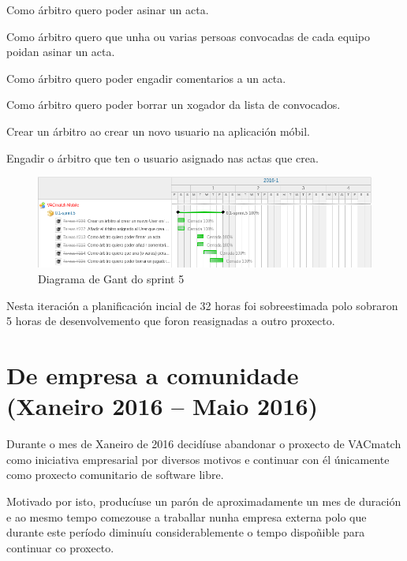         \begin{description}
         \item [S5.1] Como árbitro quero poder asinar un acta.
         \item [S5.2] Como árbitro quero que unha ou varias persoas convocadas 
de cada equipo poidan asinar un acta.
         \item [S5.3] Como árbitro quero poder engadir comentarios a un acta.
         \item [S5.4] Como árbitro quero poder borrar un xogador da lista de 
convocados.
         \item Crear un árbitro ao crear un novo usuario na aplicación móbil.
         \item Engadir o árbitro que ten o usuario asignado nas actas que crea.
        \end{description}

        \begin{figure}[h!]
          \begin{center}
          \includegraphics[width=\textwidth]{./img/gant_diagrams/05.png}
          \caption{Diagrama de Gant do sprint 5}
          \label{fig:gant05}
          \end{center}
        \end{figure}

        Nesta iteración a planificación incial de 32 horas foi sobreestimada 
polo sobraron 5 horas de desenvolvemento que foron reasignadas a outro proxecto.

  \section{De empresa a comunidade (Xaneiro 2016 -- Maio 2016)}
  Durante o mes de Xaneiro de 2016 decidíuse abandonar o proxecto de VACmatch 
como iniciativa empresarial por diversos motivos e continuar con él únicamente 
como proxecto comunitario de software libre.

  Motivado por isto, producíuse un parón de aproximadamente un mes de duración 
e ao mesmo tempo comezouse a traballar nunha empresa externa polo que durante 
este período diminuíu considerablemente o tempo dispoñible para continuar co 
proxecto.

